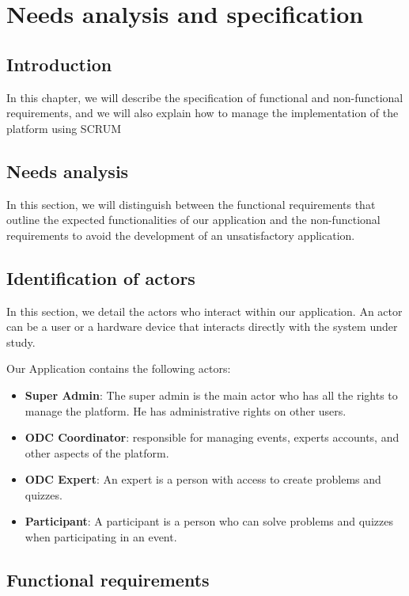 \chapter{Needs analysis and specification}
\section{Introduction}
In this chapter, we will describe the specification of functional and
non-functional requirements, and we will also explain how to manage the
implementation of the platform using SCRUM

\section{Needs analysis}
In this section, we will distinguish between the functional requirements that
outline the expected functionalities of our application and the non-functional
requirements to avoid the development of an unsatisfactory application.

\section{Identification of actors}
In this section, we detail the actors who interact within our application. An
actor can be a user or a hardware device that interacts directly with the
system under study.

Our Application contains the following actors:
\begin{itemize}
      \item \textbf{Super Admin}: The super admin is the main actor who has all
            the rights to manage the platform. He has administrative rights on
            other users.
      \item \textbf{ODC Coordinator}: responsible for managing events, experts
            accounts, and other aspects of the platform.
      \item \textbf{ODC Expert}: An expert is a person with access to create
            problems and quizzes.
      \item \textbf{Participant}: A participant is a person who can solve problems
            and quizzes when participating in an event.
\end{itemize}

\section{Functional requirements}

